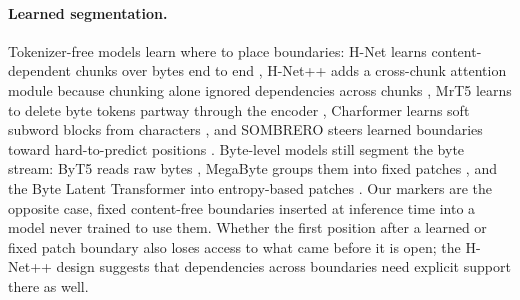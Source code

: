 \documentclass[10pt]{article} %
\begin{document}
\paragraph{Learned segmentation.} Tokenizer-free models learn where to place boundaries: H-Net learns content-dependent chunks over bytes end to end \citep{hwang2025hnet}, H-Net++ adds a cross-chunk attention module because chunking alone ignored dependencies across chunks \citep{zakershahrak2025hnetpp}, MrT5 learns to delete byte tokens partway through the encoder \citep{kallini2025mrt5}, Charformer learns soft subword blocks from characters \citep{tay2022charformer}, and SOMBRERO steers learned boundaries toward hard-to-predict positions \citep{neitemeier2026sombrero}. Byte-level models still segment the byte stream: ByT5 reads raw bytes \citep{xue2022byt5}, MegaByte groups them into fixed patches \citep{yu2023megabyte}, and the Byte Latent Transformer into entropy-based patches \citep{pagnoni2024blt}. Our markers are the opposite case, fixed content-free boundaries inserted at inference time into a model never trained to use them. Whether the first position after a learned or fixed patch boundary also loses access to what came before it is open; the H-Net++ design suggests that dependencies across boundaries need explicit support there as well.
\end{document}
